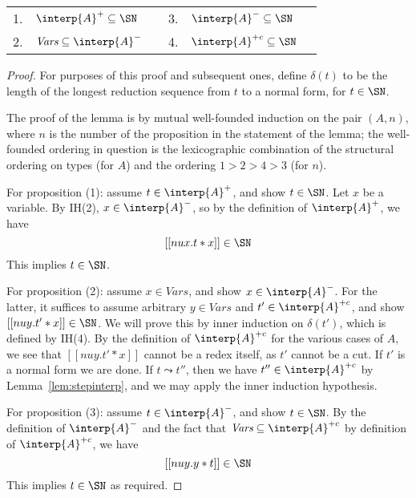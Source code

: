 \begin{lemma}[SN interpretations]
\label{lem:sninterp}

\begin{tabular}{llllll}
1. & $\interp{A}^+ \subseteq \SN$ & \hspace{2cm} & 3. & $\interp{A}^- \subseteq \SN$\\
2. & $\textit{Vars}\subseteq \interp{A}^-$ & \hspace{2cm} & 4. & $\interp{A}^{+c} \subseteq \SN$
\end{tabular}
\end{lemma}
\begin{proof}
    For purposes of this proof and subsequent ones, define $\delta(t)$ to be
  the length of the longest reduction sequence from $t$ to a normal form, for
  $t\in\SN$.

  The proof of the lemma is by mutual well-founded induction on the
  pair $(A,n)$, where $n$ is the number of the proposition in the
  statement of the lemma; the well-founded ordering in question is the
  lexicographic combination of the structural ordering on types (for $A$) 
  and the ordering $1 > 2 > 4 > 3$ (for $n$).

  For proposition (1): assume $t\in\interp{A}^+$, and show $t\in\SN$.
  Let $x$ be a variable.  By IH(2), $x\in\interp{A}^-$, so by the
  definition of $\interp{A}^+$, we have
\[
  [[ nu x . t * x]] \in \SN
\]
  This implies $t\in\SN$.

  For proposition (2): assume $x\in\textit{Vars}$, and show
  $x\in\interp{A}^-$.  For the latter, it suffices to assume arbitrary
  $y\in\textit{Vars}$ and $t'\in\interp{A}^{+c}$, and show $[[nu y
  . t' * x]] \in \SN$.  We will prove this by inner induction on
  $\delta(t')$, which is defined by IH(4).  By the definition of
  $\interp{A}^{+c}$ for the various cases of $A$, we see that $[[nu y
  . t' * x]]$ cannot be a redex itself, as $t'$ cannot be a cut.  If
  $t'$ is a normal form we are done.  If $t\leadsto t''$, then we have
  $t''\in\interp{A}^{+c}$ by Lemma~\ref{lem:stepinterp}, and we may
  apply the inner induction hypothesis.

  For proposition (3): assume $t\in\interp{A}^-$, and show $t\in\SN$.
  By the definition of $\interp{A}^-$ and the fact that $\textit{Vars}\subseteq\interp{A}^{+c}$
  by definition of $\interp{A}^{+c}$, we have 
\[
  [[nu y . y * t]] \in \SN
\]
  This implies $t\in\SN$ as required.


\end{proof}
